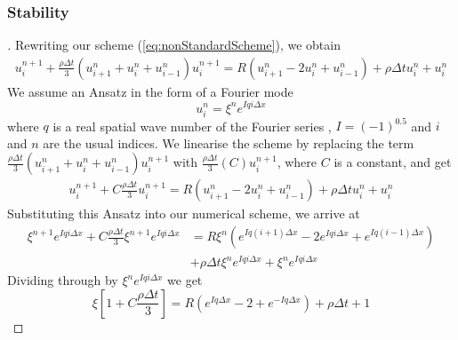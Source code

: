 \documentclass[a4paper]{article}
\begin{document}
		\subsubsection{Stability}
		\begin{proof}[]
    		    
        Rewriting our scheme (\ref{eq:nonStandardScheme}), we obtain
        \begin{align*}
            u_i^{n+1}  + \frac{\rho \Delta t}{3}(u_{i+1}^n + u_i^n + u_{i-1}^n)u_i^{n+1} = R(u_{i+1}^{n}-2u_{i}^{n}+u_{i-1}^{n})  + \rho\Delta t u_i^n+ u_i^n
        \end{align*}
        We assume an Ansatz in the form of a Fourier mode
        \begin{equation*}
        u_{i}^{n} = \xi^{n}e^{Iqi\Delta x}
        \end{equation*}
        where $q$ is a real spatial wave number of the Fourier series , $I = (-1)^{0.5}$ and $i$ and $n$ are the usual indices. We linearise the scheme by replacing the term $\frac{\rho \Delta t}{3}(u_{i+1}^n + u_i^n + u_{i-1}^n)u_i^{n+1}$ with $\frac{\rho \Delta t}{3}(C)u_i^{n+1}$, where $C$ is a constant, and get
        \begin{align*}
            u_i^{n+1}  + C\frac{\rho \Delta t}{3}u_i^{n+1} = R(u_{i+1}^{n}-2u_{i}^{n}+u_{i-1}^{n})  + \rho\Delta t u_i^n+ u_i^n
        \end{align*}
        Substituting this Ansatz into our numerical scheme, we arrive at
        \begin{equation*}
        \begin{split}
            \xi^{n+1}e^{Iqi\Delta x} + C\frac{\rho \Delta t}{3}\xi^{n+1}e^{Iqi\Delta x} &= R\xi^{n}(e^{Iq(i+1)\Delta x} - 2e^{Iqi\Delta x}
              + e^{Iq(i-1)\Delta x}) \\
              &+ \rho \Delta t \xi^{n}e^{Iqi\Delta x} + \xi^{n}e^{Iqi\Delta x} 
        \end{split}
         \end{equation*}
        Dividing through by $\xi^{n}e^{Iqi\Delta x }$ we get
        \begin{equation*}
            \xi [1 + C\frac{\rho \Delta t}{3}] = R(e^{Iq\Delta x} - 2 + e^{-Iq\Delta x}) + \rho \Delta t + 1
        \end{equation*}


\end{proof}
\end{document}
